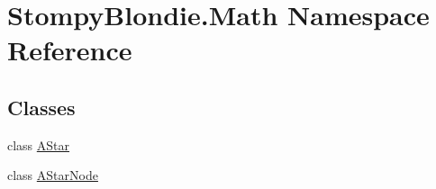 \hypertarget{namespace_stompy_blondie_1_1_math}{}\section{Stompy\+Blondie.\+Math Namespace Reference}
\label{namespace_stompy_blondie_1_1_math}
\subsection*{Classes}
\begin{DoxyCompactItemize}
\item 
class \mbox{\hyperlink{class_stompy_blondie_1_1_math_1_1_a_star}{A\+Star}}
\item 
class \mbox{\hyperlink{class_stompy_blondie_1_1_math_1_1_a_star_node}{A\+Star\+Node}}
\end{DoxyCompactItemize}
